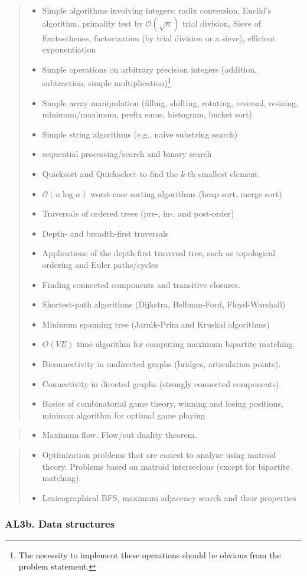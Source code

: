 \documentclass[a4paper,11pt,oneside]{article}
\newcommand{\cmark}{\ding{51}}%
\newcommand{\xmark}{\ding{55}}%
\newcommand{\CC}[1]{#1}
\newcommand{\ccode}{{\small\cmark\faFileText}}
\newcommand{\cemay}{{\small\xmark\faQuestionCircle}}
\newcommand{\cexcl}{{\small\xmark}}
\newcommand{\Icodeonly}{\item[\hbox to 1.8em{\ccode\hfill}]}
\newcommand{\Iexmaybe}{\item[\hbox to 1.8em{\cemay\hfill}]}
\newcommand{\Iexcluded}{\item[\hbox to 1.8em{\cexcl\hfill}]}
\newenvironment{myitemize}{\begin{quote}\begin{itemize}\itemsep 0pt}{\end{itemize}\end{quote}}
\begin{document}
    \begin{myitemize}
    \Icodeonly Simple algorithms involving integers: radix conversion, Euclid's algorithm, primality test by $\mathcal{O}(\sqrt{n})$ trial division, Sieve of Eratosthenes, factorization (by trial division or a sieve), efficient exponentiation
    \Icodeonly Simple operations on arbitrary precision integers (addition, subtraction, simple multiplication)\footnote{The necessity to implement these operations should be obvious from the problem statement.}
    \Icodeonly Simple array manipulation (filling, shifting, rotating, reversal, resizing, minimum/maximum, prefix sums, histogram, bucket sort)
    \Icodeonly Simple string algorithms (e.g., naive substring search)
    \Icodeonly\CC{sequential} processing/search \CC{and binary search}
    \Icodeonly \CC{Quicksort} and Quickselect to find the $k$-th smallest element.
    \Icodeonly\CC{$\mathcal{O}(n \log n)$} worst-case \CC{sorting algorithms (heap sort, merge sort)}
    \Icodeonly Traversals of ordered trees (pre-, in-, and post-order)
    \Icodeonly\CC{Depth- and breadth-first traversals}
    \Icodeonly Applications of the depth-first traversal tree, such as topological ordering and Euler paths/cycles
    \Icodeonly Finding connected components and transitive closures.
    \Icodeonly Shortest-path algorithms (Dijkstra, Bellman-Ford, Floyd-Warshall)
    \Icodeonly Minimum spanning tree (Jarn\'\i k-Prim and Kruskal algorithms)
    \Icodeonly $O(VE)$ time algorithm for computing maximum bipartite matching.
    \Icodeonly Biconnectivity in undirected graphs (bridges, articulation points).
    \Icodeonly Connectivity in directed graphs (strongly connected components).
    \Icodeonly Basics of combinatorial game theory, winning and losing positions, minimax algorithm for optimal game playing
    \end{myitemize}

    \begin{myitemize}
    \Iexmaybe Maximum flow. Flow/cut duality theorem.
    \end{myitemize}

    \begin{myitemize}
    \Iexcluded Optimization problems that are easiest to analyze using matroid theory. Problems based on matroid intersecions (except for bipartite matching).
    \Iexcluded Lexicographical BFS, maximum adjacency search and their properties
    \end{myitemize}
 
    \subsubsection*{AL3b. Data structures}%
  
\end{document}
